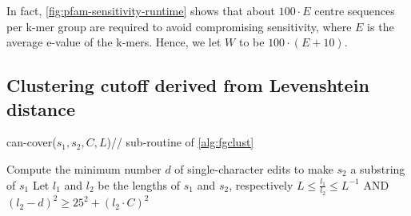 \documentclass{bioinfo}
\begin{document}
\begin{methods}
In fact, %
\cref{fig:pfam-sensitivity-runtime}
shows that about \(100\cdot E\) centre sequences per k-mer group are required to avoid compromising sensitivity, where \(E\) is the average e-value of the k-mers. Hence, we let \(W\) to be \(100\cdot(E+10)\). 

\subsection{Clustering cutoff derived from Levenshtein distance}

\label{subsec:editdist}


\begin{algorithm}[t]
	\caption{can-cover(\(s_1, s_2, C, L\))\label{alg:can-cover}\hfill // \scriptsize sub-routine of \cref{alg:fgclust}}
	Compute the minimum number \(d\) of single-character edits to make \(s_2\) a substring of \(s_1\)
	Let \(l_1\) and \(l_2\) be the lengths of \(s_1\) and \(s_2\), respectively\;
	\KwRet \(L \le \frac{l_1}{l_2} \le L^{-1}\)
	AND \((l_2-d)^2 \ge 25^2 + (l_2\cdot C)^2\)\;
\end{algorithm}


\end{methods}
\end{document}
